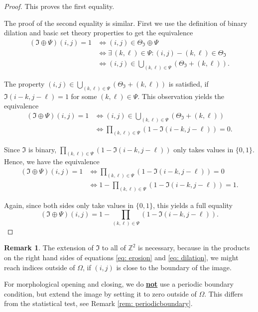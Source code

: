 \documentclass[a4paper,12pt]{article}
\theoremstyle{plain}
\theoremstyle{definition}
\newtheorem{remark}[theorem]{Remark}
\numberwithin{equation}{section}
\begin{document}
\begin{proof}
	This proves the first equality.
	
	The proof of the second equality is similar. First we use the definition of binary dilation and basic set theory properties to get the equivalence
	\begin{align*}
		(\mathfrak{I} \oplus \Psi)(i, j) = 1 &\Leftrightarrow (i, j) \in \Theta_\mathfrak{I} \oplus \Psi \\
		&\Leftrightarrow \exists \, (k, \ell) \in \Psi: (i, j) - (k, \ell) \in \Theta_\mathfrak{I} \\
		&\Leftrightarrow (i, j) \in \bigcup_{(k, \ell) \in \Psi} ( \Theta_\mathfrak{I} + (k, \ell) ).
	\end{align*}
	
	The property $(i, j) \in \bigcup_{(k, \ell) \in \Psi} ( \Theta_\mathfrak{I} + (k, \ell) )$ is satisfied, if $\mathfrak{I}(i - k, j - \ell) = 1$ for some $(k, \ell) \in \Psi$. This observation yields the equivalence
	\begin{align*}
		(\mathfrak{I} \oplus \Psi)(i, j) = 1 &\Leftrightarrow (i, j) \in \bigcup_{(k, \ell) \in \Psi} ( \Theta_\mathfrak{I} + (k, \ell) ) \\
		&\Leftrightarrow \prod_{(k, \ell) \in \Psi} ( 1 - \mathfrak{I}(i - k, j - \ell) ) = 0.
	\end{align*}
	
	Since $\mathfrak{I}$ is binary, $\prod_{(k, \ell) \in \Psi} ( 1 - \mathfrak{I}(i - k, j - \ell) )$ only takes values in $\{ 0, 1 \}$. Hence, we have the equivalence
	\begin{align*}
		(\mathfrak{I} \oplus \Psi)(i, j) = 1 &\Leftrightarrow \prod_{(k, \ell) \in \Psi} ( 1 - \mathfrak{I}(i - k, j - \ell) ) = 0 \\
		&\Leftrightarrow 1 - \prod_{(k, \ell) \in \Psi} ( 1 - \mathfrak{I}(i - k, j - \ell) ) = 1.
	\end{align*}
	
	Again, since both sides only take values in $\{ 0, 1 \}$, this yields a full equality
	\begin{equation*}
		(\mathfrak{I} \oplus \Psi)(i, j) = 1 - \prod_{(k, \ell) \in \Psi} ( 1 - \mathfrak{I}(i - k, j - \ell) ).
	\end{equation*}
\end{proof}

\begin{remark}
	The extension of $\mathfrak{I}$ to all of $\mathbb{Z}^2$ is necessary, because in the products on the right hand sides of equations \eqref{eq: erosion} and \eqref{eq: dilation}, we might reach indices outside of $\Omega$, if $(i, j)$ is close to the boundary of the image.
	
	For morphological opening and closing, we do \textbf{\underline{not}} use a periodic boundary condition, but extend the image by setting it to zero outside of $\Omega$. This differs from the statistical test, see Remark \ref{rem: periodicboundary}.
\end{remark}
\end{document}
